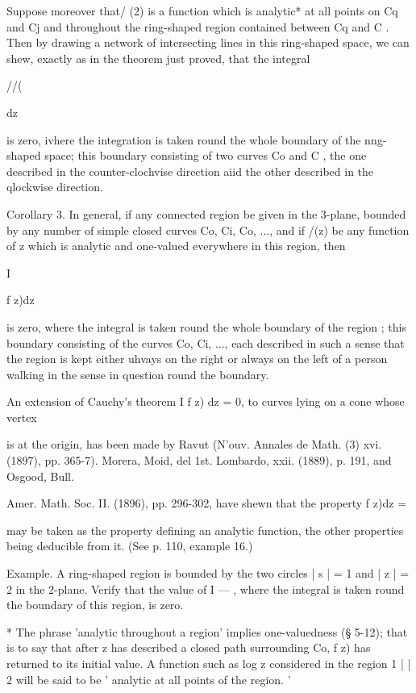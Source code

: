 {Suppose moreover that/ (2) is a function which is analytic* at all points on Cq and Cj 
and throughout the ring-shaped region contained between Cq and C  . Then by drawing a 
network of intersecting lines in this ring-shaped space, we can shew, exactly as in the 
theorem just proved, that the integral 



//(  



dz 



is zero, ivhere the integration is taken round the whole boundary of the nng-shaped space; 
this boundary consisting of two curves Co and C , the one described in the counter-clochvise 
direction aiid the other described in the qlockwise direction. 

Corollary 3. In general, if any connected region be given in the 3-plane, bounded by 
any number of simple closed curves Co, Ci, Co, ..., and if /(z) be any function of z which 
is analytic and one-valued everywhere in this region, then 



I 



f z)dz 

is zero, where the integral is taken round the whole boundary of the region ; this boundary 
consisting of the curves Co, Ci, ..., each described in such a sense that the region is kept 
either uhvays on the right or always on the left of a person walking in the sense in question 
round the boundary. 

An extension of Cauchy's theorem I f z) dz = 0, to curves lying on a cone whose vertex 

is at the origin, has been made by Ravut (N'ouv. Annales de Math. (3) xvi. (1897), 
pp. 365-7). Morera, Moid, del 1st. Lombardo, xxii. (1889), p. 191, and Osgood, Bull. 

Amer. Math. Soc. II. (1896), pp. 296-302, have shewn that the property f z)dz = 

may be taken as the property defining an analytic function, the other properties being 
deducible from it. (See p. 110, example 16.) 

Example. A ring-shaped region is bounded by the two circles | s | = 1 and | z | = 2 in the 
2-plane. Verify that the value of I — , where the integral is taken round the boundary 
of this region, is zero. 

* The phrase 'analytic throughout a region' implies one-valuedness (§ 5-12); that is to say 
that after z has described a closed path surrounding Co, f z) has returned to its initial value. A 
function such as log z considered in the region 1   |   |   2 will be said to be ' analytic at all 
points of the region. ' 



}
